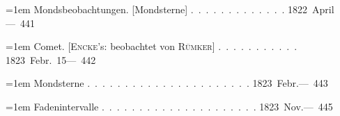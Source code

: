 \noindent\hangindent=1em Mondsbeobachtungen. [Mondsterne] \mbox{.\ .\ .\ .\ .\ .\ .\ .\ .\ .\ .\ .\ .} \hfill\mbox{1822 April}\quad\mbox{--- 441}\par\smallskip
\noindent\hangindent=1em Comet. [\textsc{Encke}'s: beobachtet von \textsc{Rümker}] \mbox{.\ .\ .\ .\ .\ .\ .\ .\ .\ .\ .} \hfill\mbox{1823 Febr. 15}\quad\mbox{--- 442}\par\smallskip
\noindent\hangindent=1em Mondsterne \mbox{.\ .\ .\ .\ .\ .\ .\ .\ .\ .\ .\ .\ .\ .\ .\ .\ .\ .\ .\ .\ .\ .} \hfill\mbox{1823 Febr.}\quad\mbox{--- 443}\par\smallskip
\noindent\hangindent=1em Fadenintervalle \mbox{.\ .\ .\ .\ .\ .\ .\ .\ .\ .\ .\ .\ .\ .\ .\ .\ .\ .\ .\ .\ .} \hfill\mbox{1823 Nov.}\quad\mbox{--- 445}\par\smallskip
\endgroup
